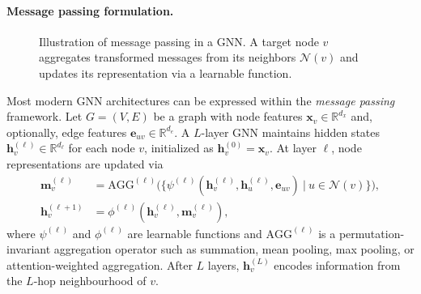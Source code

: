 \paragraph{Message passing formulation.}
\begin{figure}[H]
\centering
{}
\caption{
Illustration of message passing in a GNN.
A target node $v$ aggregates transformed messages from its neighbors
$\mathcal{N}(v)$ and updates its representation via a learnable function.
}
\label{fig:gnn_message_passing}
\end{figure}
Most modern GNN architectures can be expressed within the \emph{message passing} framework. Let $G=(V,E)$ be a graph with node features $\mathbf{x}_v \in \mathbb{R}^{d_x}$ and, optionally, edge features $\mathbf{e}_{uv}\in\mathbb{R}^{d_e}$. A $L$-layer GNN maintains hidden states $\mathbf{h}_v^{(\ell)} \in \mathbb{R}^{d_\ell}$ for each node $v$, initialized as $\mathbf{h}_v^{(0)}=\mathbf{x}_v$. At layer $\ell$, node representations are updated via
\begin{align}
\mathbf{m}_v^{(\ell)}
&=
\mathrm{AGG}^{(\ell)}
\Big(\big\{
\psi^{(\ell)}(\mathbf{h}_v^{(\ell)}, \mathbf{h}_u^{(\ell)}, \mathbf{e}_{uv})
\ \big|\ u\in \mathcal{N}(v)
\big\}\Big),
\\
\mathbf{h}_v^{(\ell+1)}
&=
\phi^{(\ell)}\!\left(\mathbf{h}_v^{(\ell)}, \mathbf{m}_v^{(\ell)}\right),
\end{align}
where $\psi^{(\ell)}$ and $\phi^{(\ell)}$ are learnable functions and $\mathrm{AGG}^{(\ell)}$ is a permutation-invariant aggregation operator such as summation, mean pooling, max pooling, or attention-weighted aggregation. After $L$ layers, $\mathbf{h}_v^{(L)}$ encodes information from the $L$-hop neighbourhood of $v$.

